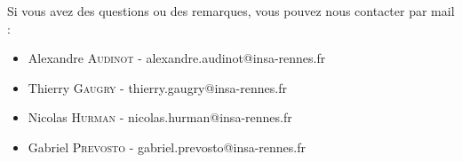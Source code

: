 Si vous avez des questions ou des remarques, vous pouvez nous contacter par mail :

\begin{itemize}
	\item Alexandre \textsc{Audinot} - alexandre.audinot@insa-rennes.fr
	\item Thierry \textsc{Gaugry} - thierry.gaugry@insa-rennes.fr
	\item Nicolas \textsc{Hurman} - nicolas.hurman@insa-rennes.fr
	\item Gabriel \textsc{Prevosto} - gabriel.prevosto@insa-rennes.fr
\end{itemize}